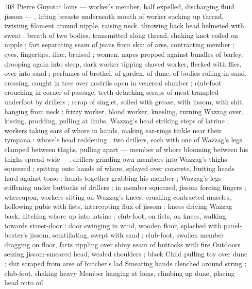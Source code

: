 108 Pierre Guyotat
loins — worker's member, half expelled, discharging fluid jissom —
, lifting breasts underneath mouth of worker sucking up thread,
twisting filament around nipple, raising neck, throwing back head
helmeted with sweat ; breath of two bodies, transmitted along
thread, shaking knot coiled on nipple ; fart separating seam of jeans
from skin of arse, contracting member ; eyes, fingertips. iliac,
bruised ; women, napes propped against bundles of barley, drooping
again into sleep, dark worker tipping shaved worker, flecked with
flies, over into sand ; perfumes of brothel, of garden, of dune, of
bodies rolling in sand, crossing, caught in tree over nostrils open in
venereal slumber ; club-foot crouching in corner of passage, teeth
detaching scraps of meat trampled underfoot by drillers ; scrap of
singlet, soiled with grease, with jissom, with shit, hanging from neck
; frizzy worker, blond worker, kneeling, turning Wazzag over, kissing,
prodding, pulling at limbs, Wazzag’s head striking steps of latrine ;
workers taking ears of whore in hands, making ear-rings tinkle near
their tympana : whore's head reddening ; two drillers, each with one
of Wazzag's legs clamped between thighs, pulling apart — member
of whore blooming between his thighs spread wide —, drillers
grinding own members into Wazzag’s thighs squeezed ; spitting onto
hands of whore, splayed over concrete, butting heads hard against
torso ; hands together grabbing his member ; Wazzag’s legs
stiffening under buttocks of drillers ; in member squeezed, jissom
forcing fingers ; whereupon, workers sitting on Wazzag's knees,
crushing contracted muscles, hollowing pubis with fists, intercepting
flux of jissom ; knees driving Wazzag back, hitching whore up into
latrine ; club-foot, on fists, on knees, walking towards street-door :
door swinging in wind, wooden floor, splashed with panel-beater's
jissom, scintillating, swept with sand ; club-foot, swollen member
dragging on floor, farts rippling over shiny seam of buttocks with fire
Outdoors seizing jissom-smeared head, wealed shoulders ; black
Child pulling toy over dune ; shit scraped from arse of butcher's lad
Smearing hands clenched around string ; club-foot, shaking heavy
Member hanging at loins, climbing up dune, placing head onto oil

